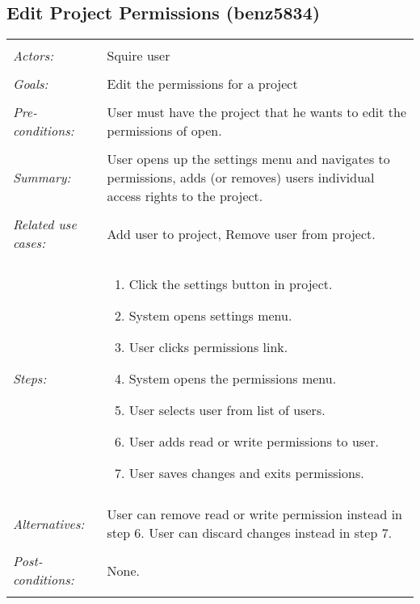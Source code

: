 \subsection{Edit Project Permissions (benz5834)}
\begin{tabular}{ p{2cm} p{12cm} }
 \hline
 \\
 \textit{Actors:} & Squire user \\ 
 \\
 \textit{Goals:} & Edit the permissions for a project \\
 \\
 \textit{Pre-conditions:} & User must have the project that he wants to edit the permissions of open. \\
 \\
 \textit{Summary:} & User opens up the settings menu and navigates to permissions, adds (or removes) users individual access rights to the project.  \\ 
 \\
 \textit{Related use cases:} & Add user to project, Remove user from project. \\ 
 \\
 \textit{Steps:} & \begin{enumerate}
  \item Click the settings button in project.
  \item System opens settings menu.
  \item User clicks permissions link.
  \item System opens the permissions menu.
  \item User selects user from list of users.
  \item User adds read or write permissions to user.
  \item User saves changes and exits permissions.
 \end{enumerate} \\
 \\
 \textit{Alternatives:} & User can remove read or write permission instead in step 6. User can discard changes instead in step 7. \\
 \\
 \textit{Post-conditions:} & None. \\
 \\
\hline
\end{tabular}


